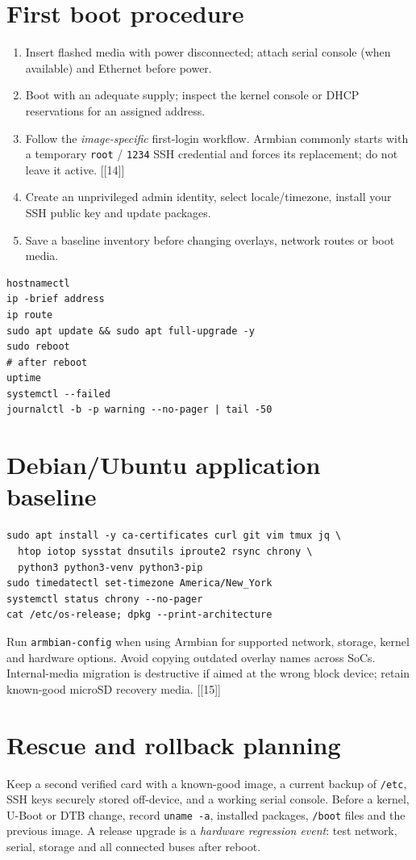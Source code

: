 \documentclass[10pt,oneside,openany]{report}
\newcommand{\code}[1]{\texttt{#1}}
\newcommand{\smallref}[1]{{\sffamily\scriptsize\color{slate}[#1]}}
\begin{document}
\section{First boot procedure}
\begin{enumerate}
\item Insert flashed media with power disconnected; attach serial console (when available) and Ethernet before power.
\item Boot with an adequate supply; inspect the kernel console or DHCP reservations for an assigned address.
\item Follow the \emph{image-specific} first-login workflow. Armbian commonly starts with a temporary \code{root} / \code{1234} SSH credential and forces its replacement; do not leave it active. \smallref{[14]}
\item Create an unprivileged admin identity, select locale/timezone, install your SSH public key and update packages.
\item Save a baseline inventory before changing overlays, network routes or boot media.
\end{enumerate}
\begin{lstlisting}[style=sh]
hostnamectl
ip -brief address
ip route
sudo apt update && sudo apt full-upgrade -y
sudo reboot
# after reboot
uptime
systemctl --failed
journalctl -b -p warning --no-pager | tail -50
\end{lstlisting}
\section{Debian/Ubuntu application baseline}
\begin{lstlisting}[style=sh]
sudo apt install -y ca-certificates curl git vim tmux jq \
  htop iotop sysstat dnsutils iproute2 rsync chrony \
  python3 python3-venv python3-pip
sudo timedatectl set-timezone America/New_York
systemctl status chrony --no-pager
cat /etc/os-release; dpkg --print-architecture
\end{lstlisting}
Run \code{armbian-config} when using Armbian for supported network, storage, kernel and hardware options. Avoid copying outdated overlay names across SoCs. Internal-media migration is destructive if aimed at the wrong block device; retain known-good microSD recovery media. \smallref{[15]}
\section{Rescue and rollback planning}
Keep a second verified card with a known-good image, a current backup of \code{/etc}, SSH keys securely stored off-device, and a working serial console. Before a kernel, U-Boot or DTB change, record \code{uname -a}, installed packages, \code{/boot} files and the previous image. A release upgrade is a \emph{hardware regression event}: test network, serial, storage and all connected buses after reboot.
\end{document}
